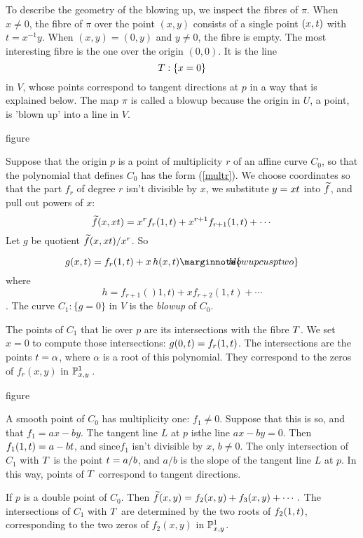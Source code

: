 \documentclass[leqno]{book}
\newcommand\Marginnote[1]{\marginnote{\hspace{-12pt}\normalfont{#1}}}
\theoremstyle{definition}%
\numberwithin{equation}{section}
\theoremstyle{theorem} %
\begin{document}
\no To describe the geometry of the blowing up, we inspect the fibres
of $\pi$.  When $x\neq0$, the fibre of $\pi$ over the point $(x,y)$
consists of a single point $(x,t)$ with $t=x^{-1}y$.  When
$(x,y)=(0,y)$ and $y\neq0$, the fibre is empty.  The most interesting
fibre is the one over the origin $(0,0)$.  It is the line
$$T :\{x=0\}$$ in $V$, whose points correspond to tangent
directions at $p$ in a way that is explained below.  The map $\pi$ is
called a {blowup} because the origin in $U$, a point, is 'blown up'
into a line in $V$.

\ms
\centerline{figure}

\ms Suppose that the origin $p$ is a point of multiplicity $r$ of an
affine curve $C_0$, so that the polynomial that defines $C_0$ has the
form (\ref{multr}).  We choose coordinates so that the part $f_r$ of
degree $r$ isn't divisible by $x$, we substitute $y=xt$ into $\widetilde f$,
and pull out powers of $x$:
 $$ \widetilde f(x,xt) = x^rf_r(1,t) + x^{r+1}f_{r+1}(1,t) + \cdots$$
Let $g$ be quotient $\widetilde f(x,xt)/x^r$.  So

\begin{equation}
g(x,\tee) = f_r(1,\tee) + x\, h(x,\tee)  \Marginnote{blowupcusptwo}
	\label{blowupcusptwo}
\end{equation}
where
$$h = f_{r+1}()1,t)+ xf_{r+2}(1,t) + \cdots$$.  
The curve $C_1 :\{g=0\}$
in $V$ is the {\it blowup} of $C_0$.

The points of $C_1$ that lie over $p$ are its intersections with the
fibre $T$.  We set $x=0$ to compute those intersections: $g(0,t)
= f_r(1,t)$.  The intersections are the points $t=\alpha$, where
$\alpha$ is a root of this polynomial. They correspond to the zeros of
$f_r(x,y)$ in $\mathbb{P}^1_{x,y}$\,.


\ms \centerline{figure}\ms

\ms A smooth point of $C_0$ has multiplicity one: $f_1 \neq 0$.
Suppose that this is so, and that $f_1 = ax-by$.  The tangent line $L$
at $p$ isthe line $ax-by=0$. Then $f_1(1,t) = a-bt$, and
since$f_1$ isn't divisible by $x$, $b\neq 0$.  The only intersection
of $C_1$ with $T$ is the point $t= a/b$, and $a/b$ is the slope
of the tangent line $L$ at $p$.  In this way, points of
$T$ correspond to tangent directions.

\ms
If $p$ is a double point of $C_0$.  Then
$
 \widetilde f(x,y) = f_2(x,y) + f_{3}(x,y) + \cdots 
.$
 The intersections of $C_1$ with $T$ are determined by the
 two roots of $f_2(1,t)$,  corresponding to the two zeros of
 $f_2(x,y)$ in $\mathbb{P}^1_{x,y}$.
\end{document}
